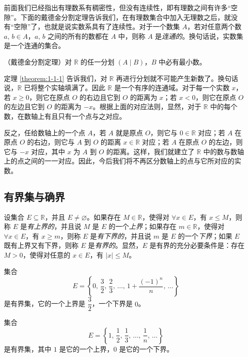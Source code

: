 \documentclass[UTF8,12pt,a4paper,fontset=fandol]{ctexbook}
\begin{document}
前面我们已经指出有理数系有稠密性，但没有连续性，即有理数之间有许多“空隙”。下面的戴德金分割定理告诉我们，在有理数集合中加入无理数之后，就没有“空隙”了，也就是说实数系具有了连续性。对于一个数集 $A$，若对任意两个数 $a,\,b\in A$，$a,\,b$ 之间的所有的数都在 $A$ 中，则称 $A$ 是\emph{连通的}。换句话说，实数集是一个连通的集合。


\begin{theorem}\label{theorem:1-1-1}
（戴德金分割定理）对 $\mathbb{R}$ 的任一分划 $(A\mid B)$，$B$ 中必有最小数。
\end{theorem}


定理 \ref{theorem:1-1-1} 告诉我们，对 $\mathbb{R}$ 再进行分划就不可能产生新数了。换句话说，$\mathbb{R}$ 已将整个实轴填满了。因此 $\mathbb{R}$ 是一个有序的连通域。对于每一个实数 $x$，若 $x\geqslant 0$，则它在原点 $O$ 的右边且它到 $O$ 的距离为 $x$；若 $x<0$，则它在原点 $O$ 的左边且它到 $O$ 的距离为 $-x$。根据上面的对应法则，显然，对于 $\mathbb{R}$ 中的每个数，在数轴上有且只有一个点与之对应。


反之，任给数轴上的一个点 $A$，若 $A$ 就是原点 $O$，则它与 $0\in\mathbb{R}$ 对应；若 $A$ 在原点 $O$ 的右边，则它与 $A$ 到 $O$ 的距离 $x\in\mathbb{R}$ 对应；若 $A$ 在原点 $O$ 的左边，则它与 $-x$ 对应，其中 $x$ 为 $A$ 到 $O$ 的距离。这样，我们就建立了 $\mathbb{R}$ 中的数与数轴上的点之间的一一对应。因此，今后我们将不再区分数轴上的点与它所对应的实数。


\subsection{有界集与确界}
设集合 $E\subseteq\mathbb{R}$，并且 $E\ne\varnothing$。如果存在 $M\in\mathbb{R}$，使得对 $\forall x\in E$，有 $x\leqslant M$，则称 $E$ 是\emph{有上界的}，并且说 $M$ 是 $E$ 的一个\emph{上界}；如果存在 $m\in\mathbb{R}$，使得对 $\forall x\in E$，有 $x\geqslant m$，则称 $E$ 是\emph{有下界的}，并且说 $m$ 是 $E$ 的一个\emph{下界}；如果 $E$ 既有上界又有下界，则称 $E$ 是\emph{有界的}。显然，$E$ 是有界的充分必要条件是：存在 $M>0$，使得对任意的 $x\in E$，有 $|x|\leqslant M$。


\begin{example}
集合
\[
  E=\left\{0,\,\frac32,\,\frac23,\,\dots,\,1+\frac{(-1)^n}{n},\,\dots\right\}
\]
是有界集，它的一个上界是 $\dfrac32$，一个下界是 $0$。
\end{example}


\begin{example}
集合
\[
  E=\left\{1,\,\frac12,\,\frac13,\,\dots,\,\frac1n,\,\dots\right\}
\]
是有界集，其中 $1$ 是它的一个上界，$0$ 是它的一个下界。
\end{example}
\end{document}
